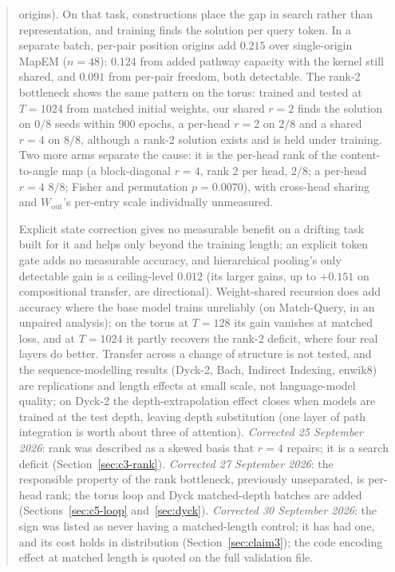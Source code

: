 \documentclass[10pt]{article}
\begin{document}
\begin{abstract}
\begin{itemize}[leftmargin=1.2em]
origins). On that task, constructions place the gap in search rather than representation, and
training finds the solution per query token. In a separate batch, per-pair position origins add
$0.215$ over single-origin MapEM ($n=48$): $0.124$ from added pathway capacity with the kernel still
shared, and $0.091$ from per-pair freedom, both detectable. The rank-2 bottleneck shows the
same pattern on the torus: trained and tested at $T=1024$ from matched initial weights, our shared $r=2$
finds the solution on $0/8$ seeds within 900 epochs, a per-head $r=2$ on $2/8$ and a shared $r=4$ on
$8/8$, although a rank-2 solution exists and is held under training. Two more arms separate the
cause: it is the per-head rank of the content-to-angle map (a block-diagonal $r=4$, rank 2 per head, $2/8$;
a per-head $r=4$ $8/8$; Fisher and permutation $p=0.0070$), with cross-head sharing and $W_{\mathrm{out}}$'s
per-entry scale individually unmeasured.
\end{itemize}
Explicit state correction gives no measurable benefit on a drifting task built for it and helps
only beyond the training length; an explicit token gate adds no measurable accuracy, and hierarchical
pooling's only detectable gain is a ceiling-level $0.012$ (its larger gains, up to $+0.151$ on compositional transfer, are directional). %
 Weight-shared recursion does add accuracy where the base model
trains unreliably (on Match-Query, in an unpaired analysis); on the torus at $T=128$ its gain vanishes at matched
loss, and at $T=1024$ it partly recovers the rank-2 deficit, where four real layers do better. Transfer across a change of structure is not tested, and the sequence-modelling results (Dyck-2,
Bach, Indirect Indexing, enwik8) are replications and length effects at small scale, not language-model
quality; on Dyck-2 the depth-extrapolation effect closes when models are trained at the test depth, leaving
depth substitution (one layer of path integration is worth about three of attention). \emph{Corrected 25 September 2026}: rank was described as a skewed basis that $r=4$ repairs; it
is a search deficit (Section~\ref{sec:c3-rank}). \emph{Corrected 27 September 2026}: the responsible property
of the rank bottleneck, previously unseparated, is per-head rank; the torus loop and Dyck matched-depth
batches are added (Sections~\ref{sec:c5-loop} and~\ref{sec:dyck}). \emph{Corrected 30 September 2026}: the sign
was listed as never having a matched-length control; it has had one, and its cost holds in distribution
(Section~\ref{sec:claim3}); the code encoding effect at matched length is quoted on the full validation file.
\end{abstract}
\end{document}
